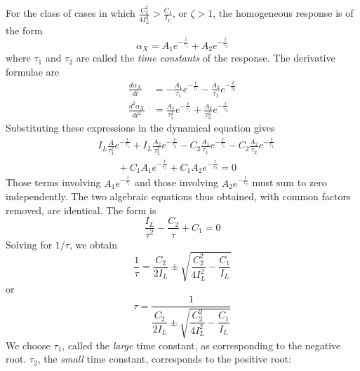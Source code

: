 For the class of cases in which $\frac{C_2^{2}}{4 I_L^{2}} > \frac{C_1}{I_L}$,
or $\zeta > 1$, the homogeneous response is of the form
\begin{equation}\label{ch2:eq:24}
\alpha_X = A_1 e^{-\frac{t}{\tau_1}} + A_2 e^{-\frac{t}{\tau_2}}
\end{equation}
where $\tau_1$ and $\tau_2$ are called the \emph{time constants} of the
response. The derivative formulae are
\begin{align*}
\frac{d\alpha_X}{dt} &= -\frac{A_1}{\tau_1} e^{-\frac{t}{\tau_1}}
  - \frac{A_2}{\tau_2} e^{-\frac{t}{\tau_2}}\\
\frac{d^{2}\alpha_X}{dt^{2}} &= \frac{A_1}{\tau_1^{2}} e^{-\frac{t}{\tau_1}}
  + \frac{A_2}{\tau_2^{2}} e^{-\frac{t}{\tau_2}}
\end{align*}
Substituting these expressions in the dynamical equation gives
\begin{align*}
&I_L \frac{A}{\tau_1^{2}} e^{-\frac{t}{\tau_1}} + I_L \frac{A_2}{\tau_2^{2}} e^{-\frac{t}{\tau_2}}
  - C_2 \frac{A_1}{\tau_1} e^{-\frac{t}{\tau_1}} - C_2 \frac{A_2}{\tau_2} e^{-\frac{t}{\tau_2}}\\
&\qquad + C_1 A_1 e^{-\frac{t}{\tau_1}} + C_1 A_2 e^{-\frac{t}{\tau_2}} = 0
\end{align*}
Those terms involving $A_1 e^{-\frac{t}{\tau_1}}$ and those involving
$A_2 e^{-\frac{t}{\tau_2}}$ must sum to zero independently. The two algebraic equations
thus obtained, with common factors removed, are identical. The form is
\begin{equation*}
\frac{I_L}{\tau^{2}} - \frac{C_2}{\tau} + C_1 = 0
\end{equation*}
Solving for $1/\tau$, we obtain
\begin{equation*}
\frac{1}{\tau} = \frac{C_2}{2 I_L} \pm \sqrt{\frac{C_2^{2}}{4 I_L^{2}} - \frac{C_1}{I_L}}
\end{equation*}
or
\begin{equation*}
\tau = \frac{1}{\dfrac{C_2}{2 I_L} \pm \sqrt{\dfrac{C_2^{2}}{4 I_L^{2}} - \dfrac{C_1}{I_L}}}
\end{equation*}
We choose $\tau_1$, called the \emph{large} time constant, as corresponding to
the negative root. $\tau_2$, the \emph{small} time constant, corresponds to the
positive root:

